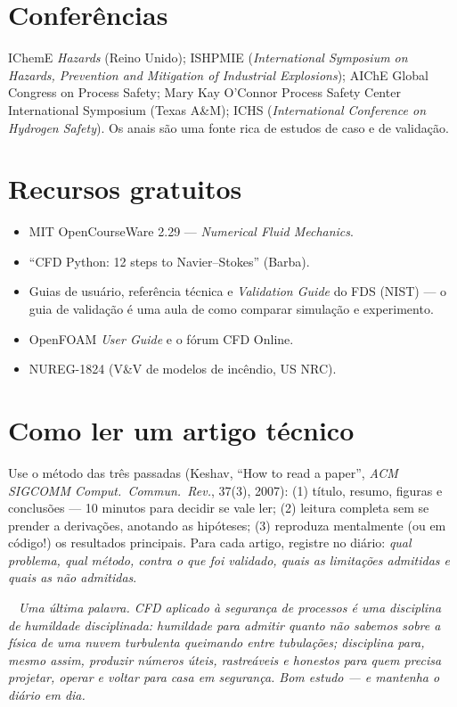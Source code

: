 \documentclass[10pt,a4paper,twocolumn,openany]{report}
\newcommand{\lead}[2]{\par\medskip\noindent{\color{#1}\bfseries #2}\ }
\newenvironment{professor}{\lead{laranja}{Nota do professor.}\itshape}{\par\medskip}
\begin{document}
\section*{Conferências}
IChemE \emph{Hazards} (Reino Unido); ISHPMIE (\emph{International Symposium on
Hazards, Prevention and Mitigation of Industrial Explosions}); AIChE Global
Congress on Process Safety; Mary Kay O'Connor Process Safety Center
International Symposium (Texas A\&M); ICHS (\emph{International Conference on
Hydrogen Safety}). Os anais são uma fonte rica de estudos de caso e de
validação.

\section*{Recursos gratuitos}
\begin{itemize}
  \item MIT OpenCourseWare 2.29 --- \emph{Numerical Fluid Mechanics}.
  \item ``CFD Python: 12 steps to Navier--Stokes'' (Barba).
  \item Guias de usuário, referência técnica e \emph{Validation Guide} do
        FDS (NIST) --- o guia de validação é uma aula de como comparar
        simulação e experimento.
  \item OpenFOAM \emph{User Guide} e o fórum CFD Online.
  \item NUREG-1824 (V\&V de modelos de incêndio, US NRC).
\end{itemize}

\section*{Como ler um artigo técnico}
Use o método das três passadas (Keshav, ``How to read a paper'',
\emph{ACM SIGCOMM Comput.\ Commun.\ Rev.}, 37(3), 2007): (1) título, resumo,
figuras e conclusões --- 10 minutos para decidir se vale ler; (2) leitura
completa sem se prender a derivações, anotando as hipóteses; (3) reproduza
mentalmente (ou em código!) os resultados principais. Para cada artigo,
registre no diário: \emph{qual problema, qual método, contra o que foi
validado, quais as limitações admitidas e quais as não admitidas}.

\begin{professor}
Uma última palavra. CFD aplicado à segurança de processos é uma disciplina
de \emph{humildade disciplinada}: humildade para admitir quanto não sabemos
sobre a física de uma nuvem turbulenta queimando entre tubulações;
disciplina para, mesmo assim, produzir números úteis, rastreáveis e honestos
para quem precisa projetar, operar e voltar para casa em segurança. Bom
estudo --- e mantenha o diário em dia.
\end{professor}
\end{document}
